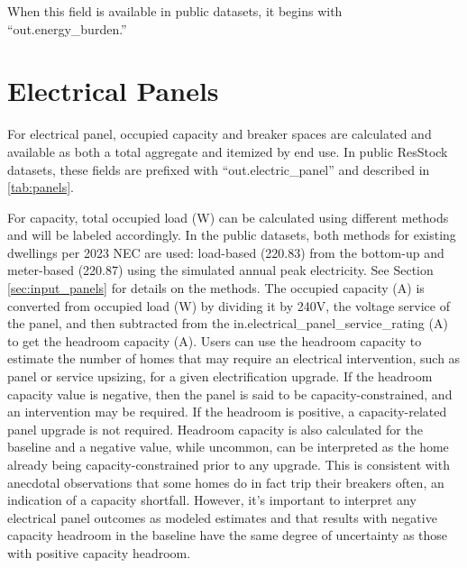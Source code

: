 When this field is available in public datasets, it begins with ``out.energy\_burden.''

\section{Electrical Panels} \label{sec:output_panels}
For electrical panel, occupied capacity and breaker spaces are calculated and available as both a total aggregate and itemized by end use. In public ResStock datasets, these fields are prefixed with “out.electric_panel” and described in \ref{tab:panels}. 

For capacity, total occupied load (W) can be calculated using different methods and will be labeled accordingly. In the public datasets, both methods for existing dwellings per 2023 NEC are used: load-based (220.83) from the bottom-up and meter-based (220.87) using the simulated annual peak electricity. See Section \ref{sec:input_panels} for details on the methods. The occupied capacity (A) is converted from occupied load (W) by dividing it by 240V, the voltage service of the panel, and then subtracted from the in.electrical_panel_service_rating (A) to get the headroom capacity (A). Users can use the headroom capacity to estimate the number of homes that may require an electrical intervention, such as panel or service upsizing, for a given electrification upgrade. If the headroom capacity value is negative, then the panel is said to be capacity-constrained, and an intervention may be required. If the headroom is positive, a capacity-related panel upgrade is not required. Headroom capacity is also calculated for the baseline and a negative value, while uncommon, can be interpreted as the home already being capacity-constrained prior to any upgrade. This is consistent with anecdotal observations that some homes do in fact trip their breakers often, an indication of a capacity shortfall. However, it's important to interpret any electrical panel outcomes as modeled estimates and that results with negative capacity headroom in the baseline have the same degree of uncertainty as those with positive capacity headroom.  

